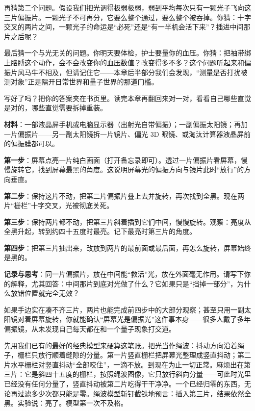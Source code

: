 再猜第二个问题。假设我们把光调得极弱极弱，弱到平均每次只有一颗光子飞向这三片偏振片。一颗光子不可再分，它要么整个通过，要么整个被吞掉。你猜：十字交叉的两片之间，一颗光子的命运是“必死”还是“有一半机会活下来”？插进中间那片之后呢？

最后猜一个与光无关的问题。你明天要体检，护士要量你的血压。你猜：把袖带绑上胳膊这个动作，会不会改变你的血压数值？改变得多不多？这个问题听起来和偏振片风马牛不相及，但请记住它——本章后半部分我们会发现，“测量是否打扰被测对象”正是隔开日常世界和量子世界的那道门槛。

写好了吗？把你的答案夹在书页里。读完本章再翻回来对一对，看看自己哪些直觉是对的，哪些直觉需要拆掉重装。


\begin{experiment}
\textbf{材料}：一部液晶屏手机或电脑显示器（出射光自带偏振）；一副偏振太阳镜；再加一片偏振片——另一副太阳镜拆一片镜片、偏光 3D 眼镜、或淘汰计算器液晶屏前的偏振膜都可以。

\textbf{第一步}：屏幕点亮一片纯白画面（打开备忘录即可）。透过一片偏振片看屏幕，慢慢旋转它，找到屏幕最黑的角度。这说明屏幕光的偏振方向与镜片此时“放行”的方向垂直。

\textbf{第二步}：保持这片不动，把第二片偏振片叠上去并旋转，再次找到全黑。现在两片“栅栏”十字交叉，光被彻底关死。

\textbf{第三步}：保持两片都不动，把第三片斜着插到它们中间，慢慢旋转。观察：亮度从全黑升起，转到约四十五度时最亮。记下最亮时第三片的角度。

\textbf{第四步}：把第三片抽出来，改放到两片的最前面或最后面，再怎么旋转，屏幕始终是黑的。

\textbf{记录与思考}：同一片偏振片，放在中间能“救活”光，放在外面毫无作用。请写下你的解释，尤其回答：中间那片到底对光做了什么？它如果只是“挡掉一部分”，为什么放错位置就完全无效？
\end{experiment}

如果手边实在凑不齐三片，两片也能完成前四步中的大部分观察；甚至只用一副太阳镜对着屏幕旋转，你就能确认“屏幕光是偏振光”这件事本身——很多人戴了多年偏振镜，从未发现自己每天都在和一个量子现象打交道。


先用我们已有的最好的经典模型来硬算这笔账。把光当作绳波：抖动方向沿着绳子，栅栏只放行顺着缝隙的分量。第一片竖直栅栏把屏幕光整理成竖直抖动；第二片水平栅栏对竖直抖动“全部咬住”，一滴不放。到现在为止一切正常。麻烦出在第三片：它是斜四十五度的栅栏，按照绳波图像，它只放行斜向分量——可此时光里已经没有任何分量了，竖直抖动被第二片吃得干干净净。一个已经归零的东西，无论再过滤多少次都只能是零。绳波模型斩钉截铁地预言：插入第三片，结果依然全黑。实验说：亮了。模型第一次不及格。

